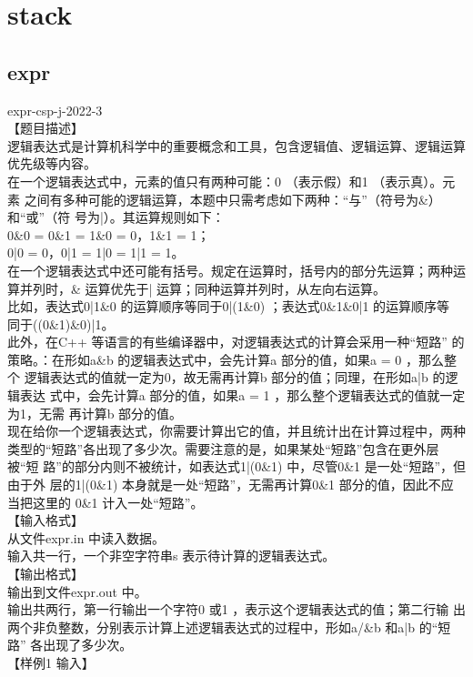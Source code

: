 \documentclass[12pt,twiside,a4paper]{ctexbook}
\numberwithin{chapter}{part}
\begin{document}
\chapter{stack}
\section{expr}
expr-csp-j-2022-3\\
【题目描述】\\
逻辑表达式是计算机科学中的重要概念和工具，包含逻辑值、逻辑运算、逻辑运算
优先级等内容。\\
在一个逻辑表达式中，元素的值只有两种可能：0 （表示假）和1 （表示真）。元素
之间有多种可能的逻辑运算，本题中只需考虑如下两种：“与”（符号为\&）和“或”（符
号为|）。其运算规则如下：\\
0\&0 = 0\&1 = 1\&0 = 0，1\&1 = 1；\\
0|0 = 0，0|1 = 1|0 = 1|1 = 1。\\
在一个逻辑表达式中还可能有括号。规定在运算时，括号内的部分先运算；两种运
算并列时，\& 运算优先于| 运算；同种运算并列时，从左向右运算。\\
比如，表达式0|1\&0 的运算顺序等同于0|(1\&0) ；表达式0\&1\&0|1 的运算顺序等
同于((0\&1)\&0)|1。\\
此外，在C++ 等语言的有些编译器中，对逻辑表达式的计算会采用一种“短路”
的策略。：在形如a\&b 的逻辑表达式中，会先计算a 部分的值，如果a = 0 ，那么整个
逻辑表达式的值就一定为0，故无需再计算b 部分的值；同理，在形如a|b 的逻辑表达
式中，会先计算a 部分的值，如果a = 1 ，那么整个逻辑表达式的值就一定为1，无需
再计算b 部分的值。\\
现在给你一个逻辑表达式，你需要计算出它的值，并且统计出在计算过程中，两种
类型的“短路”各出现了多少次。需要注意的是，如果某处“短路”包含在更外层被“短
路”的部分内则不被统计，如表达式1|(0\&1) 中，尽管0\&1 是一处“短路”，但由于外
层的1|(0\&1) 本身就是一处“短路”，无需再计算0\&1 部分的值，因此不应当把这里的
0\&1 计入一处“短路”。\\
【输入格式】\\
从文件expr.in 中读入数据。\\
输入共一行，一个非空字符串s 表示待计算的逻辑表达式。\\
【输出格式】\\
输出到文件expr.out 中。\\
输出共两行，第一行输出一个字符0 或1 ，表示这个逻辑表达式的值；第二行输
出两个非负整数，分别表示计算上述逻辑表达式的过程中，形如a/\&b 和a|b 的“短路”
各出现了多少次。\\
【样例1 输入】\\
\end{document}
